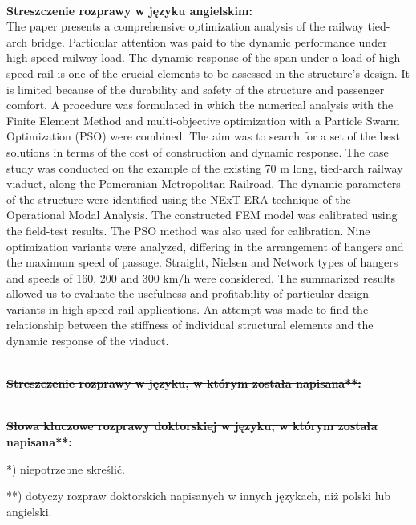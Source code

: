 \begin{myfont}
	\noindent
	\\
	\textbf{Streszczenie rozprawy w języku angielskim:}\\
	The paper presents a comprehensive optimization analysis of the railway tied-arch bridge. Particular attention was paid to the dynamic performance under high-speed railway load. The dynamic response of the span under a load of high-speed rail is one of the crucial elements to be assessed in the structure's design. It is limited because of the durability and safety of the structure and passenger comfort. A procedure was formulated in which the numerical analysis with the Finite Element Method and multi-objective optimization with a Particle Swarm Optimization (PSO) were combined. The aim was to search for a set of the best solutions in terms of the cost of construction and dynamic response. The case study was conducted on the example of the existing 70 m long, tied-arch railway viaduct, along the Pomeranian Metropolitan Railroad. The dynamic parameters of the structure were identified using the NExT-ERA technique of the Operational Modal Analysis. The constructed FEM model was calibrated using the field-test results. The PSO method was also used for calibration. Nine optimization variants were analyzed, differing in the arrangement of hangers and the maximum speed of passage. Straight, Nielsen and Network types of hangers and speeds of 160, 200 and 300 km/h were considered. The summarized results allowed us to evaluate the usefulness and profitability of particular design variants in high-speed rail applications. An attempt was made to find the relationship between the stiffness of individual structural elements and the dynamic response of the viaduct.
	
	\noindent
	\\
	{\bfseries \sout{Streszczenie rozprawy w języku, w którym została napisana**:}}
	
	\noindent
	\\
	{\bfseries \sout{Słowa kluczowe rozprawy doktorskiej w języku, w którym została napisana**:}}
	\bigskip
	
	*) niepotrzebne skreślić.
	
	**) dotyczy rozpraw doktorskich napisanych w innych językach, niż polski lub angielski.
	\vfill
	\pagebreak[4]
\end{myfont}
